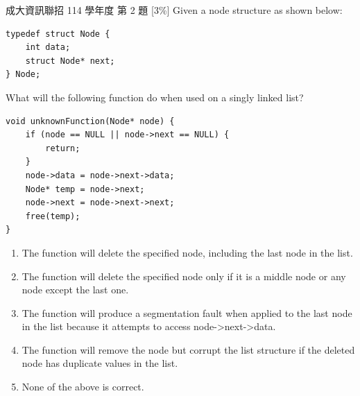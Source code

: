 \begin{pastexam}[label={px:ll-2}]{成大資訊聯招 114 學年度 第 2 題}
{[3\%]} Given a node structure as shown below:
\begin{verbatim}
typedef struct Node {
    int data;
    struct Node* next;
} Node;
\end{verbatim}
What will the following function do when used on a singly linked list?
\begin{verbatim}
void unknownFunction(Node* node) {
    if (node == NULL || node->next == NULL) {
        return;
    }
    node->data = node->next->data;
    Node* temp = node->next;
    node->next = node->next->next;
    free(temp);
}
\end{verbatim}
\begin{enumerate}[label=(\Alph*)]
\item The function will delete the specified node, including the last node in the list.
\item The function will delete the specified node only if it is a middle node or any node
except the last one.
\item The function will produce a segmentation fault when applied to the last node in
the list because it attempts to access node->next->data.
\item The function will remove the node but corrupt the list structure if the deleted
node has duplicate values in the list.
\item None of the above is correct.
\end{enumerate}
\end{pastexam}

